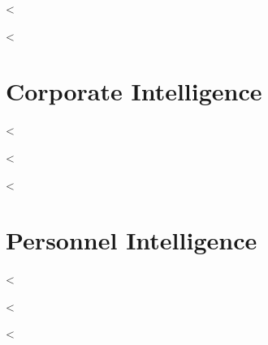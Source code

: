   <%

  <%

  \section {Corporate Intelligence}\label{sec:corporateint}

    <%

  <%

  <%

  \section {Personnel Intelligence}\label{sec:personnelint}

    <%

  <%


<%
